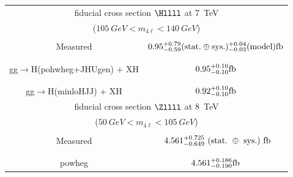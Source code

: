 \begin{table}[!h!tb]
\begin{center}
\begin{tabular}{|c|c|}
\multicolumn{2}{|c|}{fiducial cross section $\Hllll$ at 7~TeV } \\
\multicolumn{2}{|c|}{($105~GeV < m_{4\ell} < 140~GeV$)} \\
\hline %
\vspace{-0.4cm} & \\
Measured & $0.95^{+0.79}_{-0.59}({\rm stat.}\oplus{\rm sys.})^{+0.04}_{-0.03}({\rm model}) {\rm fb}$  \\ 
\vspace{-0.4cm} & \\
\hline %
\vspace{-0.4cm} & \\
\small gg$\rightarrow$H({\sc pohwheg+JHUgen}) + XH & $0.95^{+0.10}_{-0.10} {\rm fb}$ \\ 
\vspace{-0.4cm} & \\
\hline %
\vspace{-0.4cm} & \\
\small gg$\rightarrow$H({\sc minloHJJ}) + XH & $0.92^{+0.10}_{-0.10} {\rm fb}$ \\ 
\hline %
\hline %


\multicolumn{2}{|c|}{fiducial cross section $\Zllll$ at 8~TeV} \\
\multicolumn{2}{|c|}{($50~GeV < m_{4\ell} < 105~GeV$)} \\
\hline %
\vspace{-0.4cm} & \\
Measured & ~$4.561^{+0.725}_{-0.649}~({\rm stat.}~\oplus~{\rm sys.})~{\rm fb}$  \\
\vspace{-0.4cm} & \\
\hline %
\vspace{-0.4cm} & \\
\small {\sc powheg} & $ 4.561^{+0.186}_{-0.190} {\rm fb}$ \\
\hline %
\hline %
\end{tabular}
\end{center}
\end{table}

